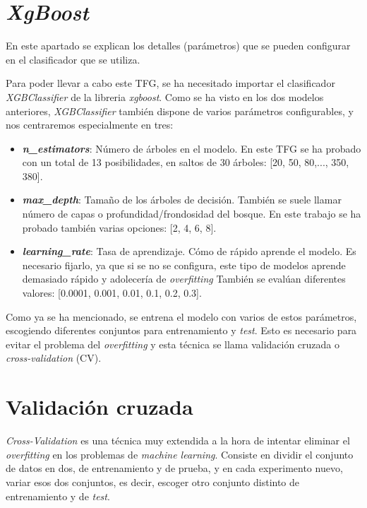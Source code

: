 \section{\textit{XgBoost}}

En este apartado se explican los detalles (parámetros) que se pueden configurar en el clasificador que se utiliza.\par 

Para poder llevar a cabo este TFG, se ha necesitado importar el clasificador \textit{XGBClassifier} de la libreria \textit{xgboost}. Como se ha visto en los dos modelos anteriores, \textit{XGBClassifier} también dispone de varios parámetros configurables, y nos centraremos especialmente en tres:
\begin{itemize}
\item \textbf{\textit{n\_estimators}}: Número de árboles en el modelo. En este TFG se ha probado con un total de 13 posibilidades, en saltos de 30 árboles: [20, 50, 80,..., 350, 380].
\item \textbf{\textit{max\_depth}}: Tamaño de los árboles de decisión. También se suele llamar número de capas o profundidad/frondosidad del bosque. En este trabajo se ha probado también varias opciones: [2, 4, 6, 8].
\item \textbf{\textit{learning\_rate}}: Tasa de aprendizaje. Cómo de rápido aprende el modelo. Es necesario fijarlo, ya que si se no se configura, este tipo de modelos aprende demasiado rápido y adolecería de \textit{overfitting}\cite{XGBoost} También se evalúan diferentes valores: [0.0001, 0.001, 0.01, 0.1, 0.2, 0.3].
\end{itemize}

Como ya se ha mencionado, se entrena el modelo con varios de estos parámetros, escogiendo diferentes conjuntos para entrenamiento y \textit{test}. Esto es necesario para evitar el problema del \textit{overfitting} y esta técnica se llama validación cruzada o \textit{cross-validation} (CV).

\section{Validación cruzada}

\textit{Cross-Validation} es una técnica muy extendida a la hora de intentar eliminar el \textit{overfitting} en los problemas de \textit{machine learning}. Consiste en dividir el conjunto de datos en dos, de entrenamiento y de prueba, y en cada experimento nuevo, variar esos dos conjuntos, es decir, escoger otro conjunto distinto de entrenamiento y de \textit{test}.\\

